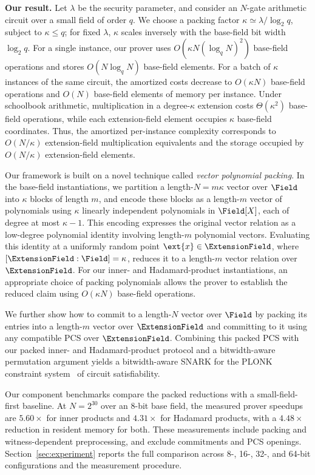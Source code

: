 \smallskip\noindent\textbf{Our result.}
Let $\lambda$ be the security parameter, and consider an $N$-gate
arithmetic circuit over a small field of order $q$.
We choose a packing factor $\kappa\simeq\lambda/\log_2 q$,
subject to $\kappa\le q$; for fixed $\lambda$, $\kappa$ scales
inversely with the base-field bit width $\log_2 q$.
For a single instance, our prover uses
$O(\kappa N(\log_q N)^2)$ base-field operations and stores
$O(N\log_q N)$ base-field elements.
For a batch of $\kappa$ instances of the same circuit, the
amortized costs decrease to $O(\kappa N)$ base-field operations
and $O(N)$ base-field elements of memory per instance.
Under schoolbook arithmetic, multiplication in a degree-$\kappa$
extension costs $\Theta(\kappa^2)$ base-field operations, while
each extension-field element occupies $\kappa$ base-field
coordinates.
Thus, the amortized per-instance complexity corresponds to
$O(N/\kappa)$ extension-field multiplication equivalents and
the storage occupied by $O(N/\kappa)$ extension-field elements.

\smallskip{}
Our \methodname framework is built on a novel technique called \emph{vector polynomial
packing}.
In the base-field instantiations, we partition a length-\(N=m\kappa\) vector over \(\Field\)
into \(\kappa\) blocks of length \(m\), and encode these blocks
as a length-\(m\) vector of polynomials using \(\kappa\)
linearly independent polynomials in \(\Field[X]\), each of
degree at most \(\kappa-1\).
This encoding expresses the original vector relation as a
low-degree polynomial identity involving length-\(m\) polynomial vectors.
Evaluating this identity at a uniformly random point
\(\ext{x}\in\ExtensionField\), where
\([\ExtensionField:\Field]=\kappa\), reduces it to a
length-\(m\) vector relation over \(\ExtensionField\).
For our inner- and Hadamard-product instantiations, an appropriate
choice of packing polynomials allows the prover to establish
the reduced claim using \(O(\kappa N)\) base-field operations.

We further show how to commit to a length-\(N\) vector over
\(\Field\) by packing its entries into a length-\(m\) vector
over \(\ExtensionField\) and committing to it using any
compatible PCS over \(\ExtensionField\).
Combining this packed PCS with our packed inner- and Hadamard-product protocol and
a bitwidth-aware permutation argument yields a bitwidth-aware
SNARK for the PLONK constraint system~\cite{iacr/GabizonWC19} of circuit satisfiability.


\smallskip{}
Our component benchmarks compare the packed reductions with a
small-field-first baseline. At \(N=2^{30}\) over an 8-bit base
field, the measured prover speedups are \(5.60\times\) for inner
products and \(4.31\times\) for Hadamard products, with a
\(4.48\times\) reduction in resident memory for both.
These measurements include packing and witness-dependent
preprocessing, and exclude commitments and PCS openings.
Section~\ref{sec:experiment} reports the full comparison across
8-, 16-, 32-, and 64-bit configurations and the measurement procedure.


